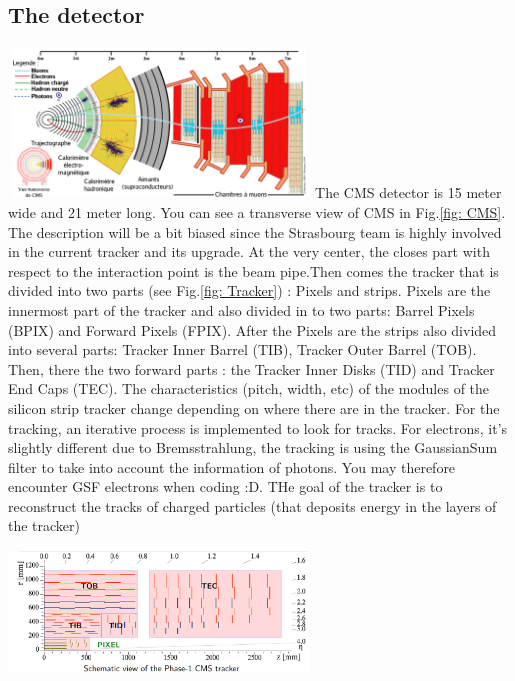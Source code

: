 \documentclass[reprint, a4paper, nofootinbib, amsmath, amssymb, aps]{revtex4-1}
\begin{document}
    \subsection{The detector}
    \includegraphics[height=4cm, width=8cm, trim= 0cm 0cm 0cm 0cm,clip]{Images/cmsAll.png}
    \label{fig: CMS}
    The CMS detector is 15 meter wide and 21 meter long. You can see a transverse view of CMS in Fig.\ref{fig: CMS}. The description will be a bit biased since the Strasbourg team is highly involved in the current tracker and its upgrade. At the very center, the closes part with respect to the interaction point is the beam pipe.Then comes the tracker that is divided into two parts (see Fig.\ref{fig: Tracker}) : Pixels and strips. Pixels are the innermost part of the tracker and also divided in to two parts: Barrel Pixels (BPIX) and Forward Pixels (FPIX). After the Pixels are the strips also divided into several parts: Tracker Inner Barrel (TIB), Tracker Outer Barrel (TOB). Then, there the two forward parts : the Tracker Inner Disks (TID) and Tracker End Caps (TEC). The characteristics (pitch, width, etc) of the modules of the silicon strip tracker change depending on where there are in the tracker.
    For the tracking, an iterative process is implemented to look for tracks. For electrons, it's slightly different due to Bremsstrahlung, the tracking is using the GaussianSum filter to take into account the information of photons. You may therefore encounter GSF electrons when coding :D. THe goal of the tracker is to reconstruct the tracks of charged particles (that deposits energy in the layers of the tracker)\\
    \includegraphics[height=4cm, width=8cm, trim= 0cm 0cm 0cm 0cm,clip]{Images/CMSTracker.png}\label{fig: Tracker}
\end{document}
